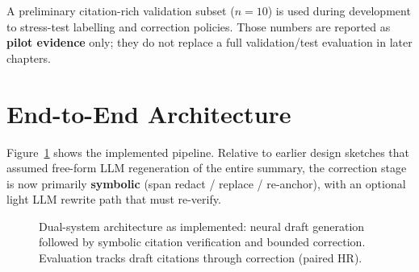A preliminary citation-rich validation subset ($n=10$) is used during development to stress-test labelling and correction policies. Those numbers are reported as \textbf{pilot evidence} only; they do not replace a full validation/test evaluation in later chapters.

\section{End-to-End Architecture}
\label{sec:method-architecture}

Figure~\ref{fig:architecture} shows the implemented pipeline. Relative to earlier design sketches that assumed free-form LLM regeneration of the entire summary, the correction stage is now primarily \textbf{symbolic} (span redact / replace / re-anchor), with an optional light LLM rewrite path that must re-verify.

\begin{figure}[!t]
\centering
{}
\caption{Dual-system architecture as implemented: neural draft generation followed by symbolic citation verification and bounded correction. Evaluation tracks draft citations through correction (paired HR).}
\label{fig:architecture}
\end{figure}

